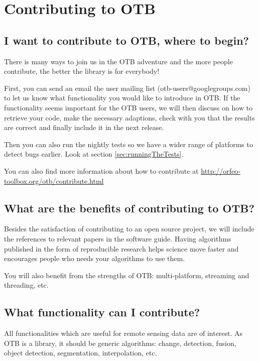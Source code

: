 \section{Contributing to OTB}\label{sec:contributing}

\subsection{I want to contribute to OTB, where to begin?}

There is many ways to join us in the OTB adventure and the more people
contribute, the better the library is for everybody!

First, you can send an email the user mailing list (otb-users@googlegroups.com)
to let us know what functionality
you would like to introduce in OTB. If the functionality seems important for the
OTB users, we will then discuss on how to retrieve your code,
make the necessary adaptions, check with you that the results are correct and finally
include it in the next release.

Then you can also run the nightly tests so we have a wider range of platforms to detect
bugs earlier. Look at section \ref{sec:runningTheTests}.

You can also find more information about how to contribute at \url{http://orfeo-toolbox.org/otb/contribute.html}

\subsection{What are the benefits of contributing to OTB?}

Besides the satisfaction of contributing to an open source project, we will include
the references to relevant papers in the software guide. Having algorithms
published in the form of reproducible research helps science move faster and
encourages people who needs your algorithms to use them.

You will also benefit from the strengths of OTB: multi-platform, streaming and
threading, etc.

\subsection{What functionality can I contribute?}

All functionalities which are useful for remote sensing data are of interest. As
OTB is a library, it should be generic algorithms: change, detection, fusion,
object detection, segmentation, interpolation, etc.

